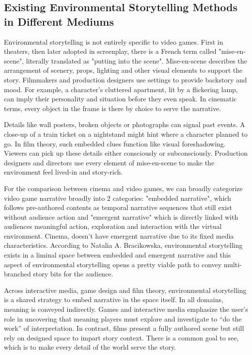        \subsection{Existing Environmental Storytelling Methods in Different Mediums}
            Environmental storytelling is not entirely specific to video games. First in theaters, then later adopted in screenplay, there is a French term called "mise-en-scene", literally translated as "putting into the scene". Mise-en-scene describes the arrangement of scenery, props, lighting and other visual elements to support the story. Filmmakers and production designers use settings to provide backstory and mood. For example, a character’s cluttered apartment, lit by a flickering lamp, can imply their personality and situation before they even speak. In cinematic terms, every object in the frame is there by choice to serve the narrative.\cite{Mise_en_scene}\par
        
            Details like wall posters, broken objects or photographs can signal past events. A close-up of a train ticket on a nightstand might hint where a character planned to go. In film theory, such embedded clues function like visual foreshadowing. Viewers can pick up these details either consciously or subconsciously. Production designers and directors use every element of mise-en-scene to make the environment feel lived-in and story-rich.\par
            
            For the comparison between cinema and video games, we can broadly categorize video game narrative broadly into 2 categories: "embedded narrative", which follows pre-authored contents as temporal narrative sequences that still exist without audience action and "emergent narrative" which is directly linked with audiences meaningful action, exploration and interaction with the virtual environment\cite{Liminal_Space_Between_Embedded_and_Emergent_Narrative}. Cinema, doesn't have emergent narrative due to its fixed media characteristics. According to Natalia A. Bracikowska, environmental storytelling exists in a liminal space between embedded and emergent narrative\cite{Liminal_Space_Between_Embedded_and_Emergent_Narrative} and this aspect of environmental storytelling opens a pretty viable path to convey multi-branched story bits for the audience.\par
            
            Across interactive media, game design and film theory, environmental storytelling is a shared strategy to embed narrative in the space itself. In all domains, meaning is conveyed indirectly. Games and interactive media emphasize the user’s role in uncovering that meaning players must explore and investigate to “do the work” of interpretation. In contrast, films present a fully authored scene but still rely on designed space to impart story context. There is a common goal to see, which is to make every detail of the world serve the story.\par
